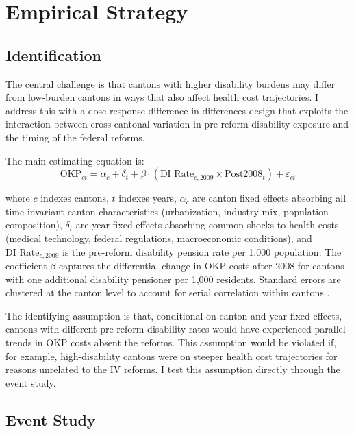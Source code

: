 \documentclass[12pt]{article}
\begin{document}
\section{Empirical Strategy}

\subsection{Identification}

The central challenge is that cantons with higher disability burdens may differ from low-burden cantons in ways that also affect health cost trajectories. I address this with a dose-response difference-in-differences design that exploits the interaction between cross-cantonal variation in pre-reform disability exposure and the timing of the federal reforms.

The main estimating equation is:
\begin{equation}
\text{OKP}_{ct} = \alpha_c + \delta_t + \beta \cdot (\text{DI Rate}_{c,2009} \times \text{Post2008}_t) + \varepsilon_{ct}
\label{eq:main}
\end{equation}

\noindent where $c$ indexes cantons, $t$ indexes years, $\alpha_c$ are canton fixed effects absorbing all time-invariant canton characteristics (urbanization, industry mix, population composition), $\delta_t$ are year fixed effects absorbing common shocks to health costs (medical technology, federal regulations, macroeconomic conditions), and $\text{DI Rate}_{c,2009}$ is the pre-reform disability pension rate per 1,000 population. The coefficient $\beta$ captures the differential change in OKP costs after 2008 for cantons with one additional disability pensioner per 1,000 residents. Standard errors are clustered at the canton level to account for serial correlation within cantons \citep{bertrand2004much}.

The identifying assumption is that, conditional on canton and year fixed effects, cantons with different pre-reform disability rates would have experienced parallel trends in OKP costs absent the reforms. This assumption would be violated if, for example, high-disability cantons were on steeper health cost trajectories for reasons unrelated to the IV reforms. I test this assumption directly through the event study.

\subsection{Event Study}
\end{document}

